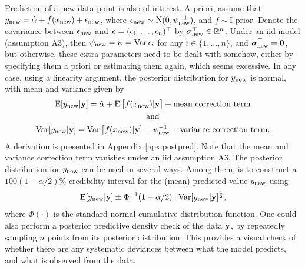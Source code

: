 Prediction of a new data point is also of interest.
A priori, assume that $y_{\text{new}} = \hat\alpha + f(x_{\text{new}}) + \epsilon_{\text{new}}$, where $\epsilon_{\text{new}} \sim \operatorname{N}(0,\psi^{-1}_{\text{new}})$, and $f\sim \text{I-prior}$.
Denote the covariance between $\epsilon_{\text{new}}$ and ${\bm\epsilon} = (\epsilon_1,\dots,\epsilon_n)^\top$ by ${\bm\sigma}_{\text{new}}^\top \in \mathbb{R}^n$.
Under an iid model (assumption A3), then $\psi_{\text{new}} = \psi = \operatorname{Var} \epsilon_i$ for any $i\in\{1,\dots,n\}$, and ${\bm\sigma}_{\text{new}}^\top={\mathbf 0}$, but otherwise, these extra parameters need to be dealt with somehow, either by specifying them a priori or estimating them again, which seems excessive.
In any case, using a linearity argument, the posterior distribution for $y_{\text{new}}$ is normal, with mean and variance given by
\begin{gather}
  \operatorname{E}[y_{\text{new}}|{\mathbf y}] = \hat\alpha + \operatorname{E} \big[ f(x_{\text{new}}) |{\mathbf y} \big] + \text{mean correction term} \\
  \text{and} \nonumber \\
  \operatorname{Var}[y_{\text{new}}|{\mathbf y}] 
  = \operatorname{Var}\big[f(x_{\text{new}})|{\mathbf y}\big] + \psi^{-1}_{\text{new}} + \text{variance correction term}.
\end{gather}
A derivation is presented in Appendix \ref{apx:postpred}.
Note that the mean and variance correction term vanishes under an iid assumption A3.
The posterior distribution for $y_{\text{new}}$ can be used in several ways. 
Among them, is to construct a $100(1 - \alpha/2)\%$ credibility interval for the (mean) predicted value $y_{\text{new}}$ using
\[
  \operatorname{E}[y_{\text{new}}|{\mathbf y}] \pm \Phi^{-1}(1 - \alpha/2) \cdot \operatorname{Var}[y_{\text{new}}|{\mathbf y}]^{\frac{1}{2}},
\]
where $\Phi(\cdot)$ is the standard normal cumulative distribution function.
One could also perform a posterior predictive density check of the data ${\mathbf y}$, by repeatedly sampling $n$ points from its posterior distribution.
This provides a visual check of whether there are any systematic deviances between what the model predicts, and what is observed from the data.

